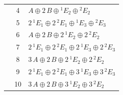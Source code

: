 \documentclass[11pt]{article}
\begin{document}
\begin{longtable}{l c p{}}
 & 4 & $A\oplus 2\,B\oplus {}^{1}E_{2}\oplus {}^{2}E_{2}$\\
 & 5 & $2\,{}^{1}E_{1}\oplus 2\,{}^{2}E_{1}\oplus {}^{1}E_{3}\oplus {}^{2}E_{3}$\\
 & 6 & $A\oplus 2\,B\oplus 2\,{}^{1}E_{2}\oplus 2\,{}^{2}E_{2}$\\
 & 7 & $2\,{}^{1}E_{1}\oplus 2\,{}^{2}E_{1}\oplus 2\,{}^{1}E_{3}\oplus 2\,{}^{2}E_{3}$\\
 & 8 & $3\,A\oplus 2\,B\oplus 2\,{}^{1}E_{2}\oplus 2\,{}^{2}E_{2}$\\
 & 9 & $2\,{}^{1}E_{1}\oplus 2\,{}^{2}E_{1}\oplus 3\,{}^{1}E_{3}\oplus 3\,{}^{2}E_{3}$\\
 & 10 & $3\,A\oplus 2\,B\oplus 3\,{}^{1}E_{2}\oplus 3\,{}^{2}E_{2}$\\
\hline
\end{longtable}
\end{document}
